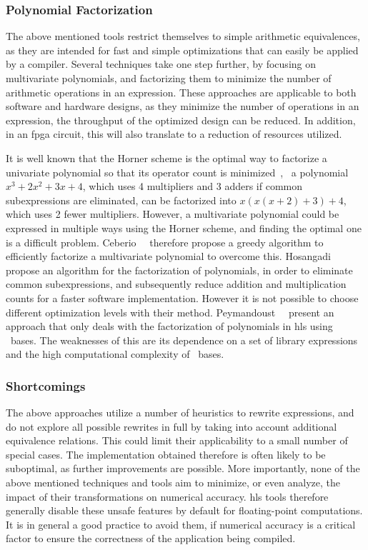 \subsubsection{Polynomial Factorization}

The above mentioned tools restrict themselves to simple arithmetic
equivalences, as they are intended for fast and simple optimizations that can
easily be applied by a compiler.  Several techniques take one step further,
by focusing on multivariate polynomials, and factorizing them to minimize
the number of arithmetic operations in an expression.  These approaches are
applicable to both software and hardware designs, as they minimize the number
of operations in an expression, the throughput of the optimized design can be
reduced.  In addition, in an \gls{fpga} circuit, this will also translate to a
reduction of resources utilized.

It is well known that the Horner scheme is the optimal way to
factorize a univariate polynomial so that its operator count is
minimized~\cite{neumaier01}, \eg~a polynomial $x^3 + 2x^2 + 3x + 4$,
which uses 4 multipliers and 3 adders if common subexpressions are
eliminated, can be factorized into $x(x(x + 2) + 3) + 4$, which uses 2
fewer multipliers.  However, a multivariate polynomial could be expressed
in multiple ways using the Horner scheme, and finding the optimal one is
a difficult problem.  Ceberio~\etal~\cite{ceberio04} therefore propose a
greedy algorithm to efficiently factorize a multivariate polynomial to
overcome this.  Hosangadi~\etal~\cite{hosangadi} propose an algorithm for the
factorization of polynomials, in order to eliminate common subexpressions, and
subsequently reduce addition and multiplication counts for a faster software
implementation.  However it is not possible to choose different optimization
levels with their method.  Peymandoust~\etal~\cite{peymandoust} present an
approach that only deals with the factorization of polynomials in \gls{hls}
using \groebner~bases.  The weaknesses of this are its dependence on a set of
library expressions~\cite{hosangadi} and the high computational complexity of
\groebner~bases.

\subsubsection{Shortcomings}

The above approaches utilize a number of heuristics to rewrite expressions, and
do not explore all possible rewrites in full by taking into account additional
equivalence relations.  This could limit their applicability to a small number
of special cases.  The implementation obtained therefore is often likely to
be suboptimal, as further improvements are possible.  More importantly, none
of the above mentioned techniques and tools aim to minimize, or even analyze,
the impact of their transformations on numerical accuracy.  \Gls{hls} tools
therefore generally disable these unsafe features by default for floating-point
computations.  It is in general a good practice to avoid them, if numerical
accuracy is a critical factor to ensure the correctness of the application
being compiled.

